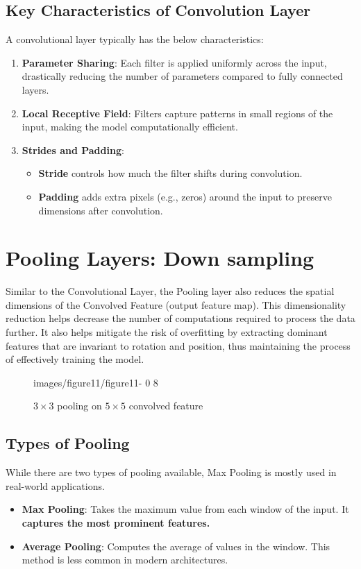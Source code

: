 \subsection{Key Characteristics of Convolution Layer}
A convolutional layer typically has the below characteristics:
\begin{enumerate}
    \item \textbf{Parameter Sharing}: Each filter is applied uniformly across the input, drastically reducing the number of parameters compared to fully connected layers.\cite{goodfellow2016deep}
    \item \textbf{Local Receptive Field}: Filters capture patterns in small regions of the input, making the model computationally efficient.\cite{dumoulin2016guide}
    \item \textbf{Strides and Padding}:
    \begin{itemize}
        \item \textbf{Stride} controls how much the filter shifts during convolution.
        \item \textbf{Padding} adds extra pixels (e.g., zeros) around the input to preserve dimensions after convolution.
    \end{itemize}
\end{enumerate}

\section{Pooling Layers: Down sampling}
Similar to the Convolutional Layer, the Pooling layer also reduces the spatial dimensions of the Convolved Feature (output feature map). This dimensionality reduction helps decrease the number of computations required to process the data further. It also helps mitigate the risk of overfitting by extracting dominant features that are invariant to rotation and position, thus maintaining the process of effectively training the model.

\begin{figure}
    \centering
    {images/figure11/figure11-} %
    {0} %
    {8} %
    \caption{$3 \times 3$ pooling on $5 \times 5$ convolved feature}
    \label{fig:11}
\end{figure}

\subsection{Types of Pooling}
While there are two types of pooling available, Max Pooling is mostly used in real-world applications.
\begin{itemize}
    \item \textbf{Max Pooling}: Takes the maximum value from each window of the input. It \textbf{captures the most prominent features.}\cite{zeiler2014visualizing}
    \item \textbf{Average Pooling}: Computes the average of values in the window. This method is less common in modern architectures.\cite{lecun1998gradient}
\end{itemize}


